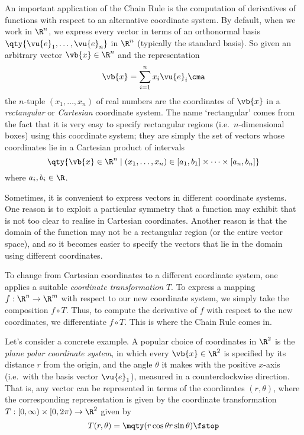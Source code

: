 \vspace{3mm}

An important application of the Chain Rule is the computation of derivatives of functions with respect to an alternative coordinate system. By default, when we work in \( \R^n \), we express every vector in terms of an orthonormal basis \( \qty{\vu{e}_1,\dots, \vu{e}_n} \) in \( \R^n \) (typically the standard basis). So given an arbitrary vector \( \vb{x}\in\R^n \) and the representation
\[ \vb{x}=\sum_{i=1}^nx_i\vu{e}_i\cma \]
the \( n \)-tuple \( (x_1,\dots,x_n) \) of real numbers are the coordinates of \( \vb{x} \) in a \emph{rectangular} or \emph{Cartesian} coordinate system. The name `rectangular' comes from the fact that it is very easy to specify rectangular regions (i.e.\ \( n \)-dimensional boxes) using this coordinate system; they are simply the set of vectors whose coordinates lie in a Cartesian product of intervals
\[ \qty{\vb{x}\in\R^n\mid (x_1,\dots,x_n)\in [a_1,b_1]\times\dots\times[a_n,b_n]} \]
where \( a_i,b_i\in\R \).

\vspace{3mm}

Sometimes, it is convenient to express vectors in different coordinate systems. One reason is to exploit a particular symmetry that a function may exhibit that is not too clear to realise in Cartesian coordinates. Another reason is that the domain of the function may not be a rectangular region (or the entire vector space), and so it becomes easier to specify the vectors that lie in the domain using different coordinates.

\vspace{3mm}

To change from Cartesian coordinates to a different coordinate system, one applies a suitable \emph{coordinate transformation} \( T \). To express a mapping \( f:\R^n\to\R^m \) with respect to our new coordinate system, we simply take the composition \( f\circ T \). Thus, to compute the derivative of \( f \) with respect to the new coordinates, we differentiate \( f\circ T \). This is where the Chain Rule comes in.

\vspace{3mm}

Let's consider a concrete example. A popular choice of coordinates in \( \R^2 \) is the \emph{plane polar coordinate system}, in which every \( \vb{x}\in\R^2 \) is specified by its distance \( r \) from the origin, and the angle \( \theta \) it makes with the positive \( x \)-axis (i.e.\ with the basis vector \( \vu{e}_1 \)), measured in a counterclockwise direction. That is, any vector can be represented in terms of the coordinates \( (r,\theta) \), where the corresponding representation is given by the coordinate transformation \( T:[0,\infty)\times[0,2\pi)\to\R^2 \) given by
\[ T(r,\theta)=\mqty(r\cos\theta\\ r\sin\theta)\fstop \]

